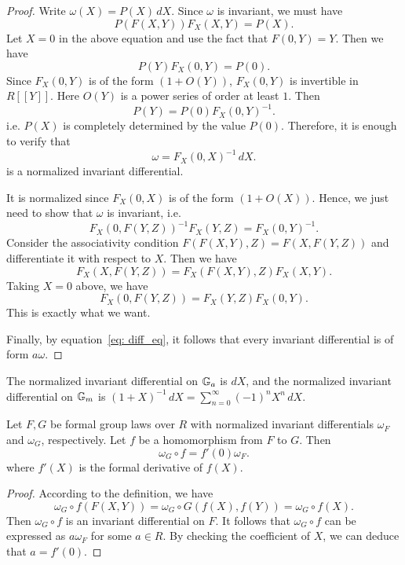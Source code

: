 \begin{proof}
    Write $\omega (X) = P(X)\, dX$. Since $\omega$ is invariant, we must have
    \[ P(F(X,Y)) F_X(X,Y) = P (X). \]
    Let $X = 0$ in the above equation and use the fact that $F(0 ,Y) = Y$.
    Then we have
    \[ P(Y) F_X(0, Y) = P (0). \]
    Since $F_X(0,Y)$ is of the form $(1 + O(Y))$, $F_X(0,Y)$ is invertible in
    $R[\![Y]\!]$. Here $O(Y)$ is a power series of order at least $1$. Then
    \begin{equation}
        P(Y) = P(0) F_X(0,Y) ^ {-1}.
        \label{eq: diff_eq}
    \end{equation}
    i.e. $P(X)$ is completely determined by the value $P(0)$.
    Therefore, it is enough to verify that
    \[ \omega = F_X(0,X) ^ {-1}\, dX. \]
    is a normalized invariant differential.

    It is normalized since $F_X(0,X)$ is of the form $(1 + O(X))$. Hence, we just need to
    show that $\omega$ is invariant, i.e.
    \[ F_X(0, F(Y,Z)) ^{-1} F_X(Y,Z) = F_X(0,Y) ^ {-1}. \]
    Consider the associativity condition $F(F(X,Y),Z) = F(X,F(Y,Z))$ and differentiate it
    with respect to $X$. Then we have
    \[F_X(X,F(Y,Z)) = F_X(F(X,Y), Z) F_X(X,Y). \]
    Taking $X = 0$ above, we have
    \[F_X(0,F(Y,Z)) = F_X(Y,Z) F_X(0,Y). \]
    This is exactly what we want.

    Finally, by equation~\eqref{eq: diff_eq}, it follows that every invariant differential is
    of form $a \omega$.
\end{proof}

\begin{example}
    The normalized invariant differential on $\mathbb{G}_a$ is $dX$, and the normalized invariant
    differential on $\mathbb{G}_m$ is $(1 + X) ^{-1}\, dX = \sum_{n=0}^{\infty} (-1)^n X ^ n\, d X$.
\end{example}

\begin{corollary}
    Let $F,G$ be formal group laws over $R$ with normalized invariant differentials $\omega_F$
    and $\omega_G$, respectively. Let $f$ be a homomorphism from $F$ to $G$. Then
    \[ \omega_G \circ f = f'(0) \omega_F .\]
    where $f'(X)$ is the formal derivative of $f(X)$.
    \label{cor: omega_hom_a}
\end{corollary}

\begin{proof}
    According to the definition, we have
    \[ \omega_G \circ f (F (X,Y)) = \omega_G \circ G(f(X), f(Y)) = \omega_G \circ f (X).\]
    Then $\omega_G \circ f$ is an invariant differential on $F$. It follows that $\omega_G \circ f$
    can be expressed as $a \omega_F$ for some $a \in R$. By checking the coefficient of $X$,
    we can deduce that $a = f'(0)$.
\end{proof}

